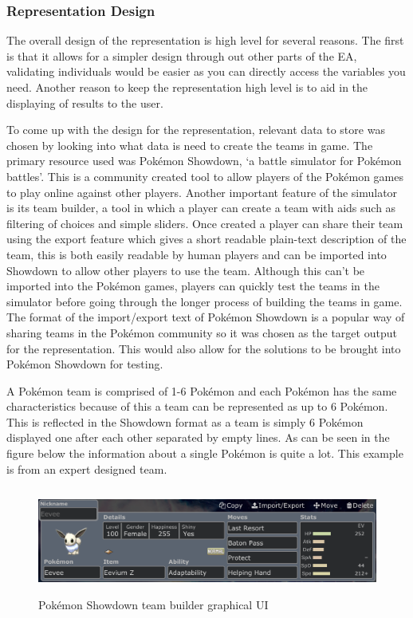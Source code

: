 \documentclass[a4paper]{article}
\newcommand{\Pokemon}{Pok\'{e}mon}
\begin{document}
\subsubsection{Representation Design}
\par
The overall design of the representation is high level for several reasons.
The first is that it allows for a simpler design through out other parts of the EA, validating individuals would be easier as you can directly access the variables you need.
Another reason to keep the representation high level is to aid in the displaying of results to the user.
\par
To come up with the design for the representation, relevant data to store was chosen by looking into what data is need to create the teams in game.
The primary resource used was \Pokemon{} Showdown, `a battle simulator for \Pokemon{} battles'\cite{showdown}.
This is a community created tool to allow players of the \Pokemon{} games to play online against other players.
Another important feature of the simulator is its team builder, a tool in which a player can create a team with aids such as filtering of choices and simple sliders.
Once created a player can share their team using the export feature which gives a short readable plain-text description of the team, this is both easily readable by human players and can be imported into Showdown to allow other players to use the team.
Although this can't be imported into the \Pokemon{} games, players can quickly test the teams in the simulator before going through the longer process of building the teams in game.
The format of the import/export text of \Pokemon{} Showdown is a popular way of sharing teams in the \Pokemon{} community so it was chosen as the target output for the representation.
This would also allow for the solutions to be brought into \Pokemon{} Showdown for testing.
\par
A \Pokemon{} team is comprised of 1-6 \Pokemon{} and each \Pokemon{} has the same characteristics because of this a team can be represented as up to 6 \Pokemon{}.
This is reflected in the Showdown format as a team is simply 6 \Pokemon{} displayed one after each other separated by empty lines.
As can be seen in the figure below the information about a single \Pokemon{} is quite a lot.
This example is from an expert designed team.
\begin{figure}[H]
	\centering
	\includegraphics[height=3.5cm]{showdownTeamBuilder.png}
	\caption{\Pokemon{} Showdown team builder graphical UI}
\end{figure}
\end{document}
